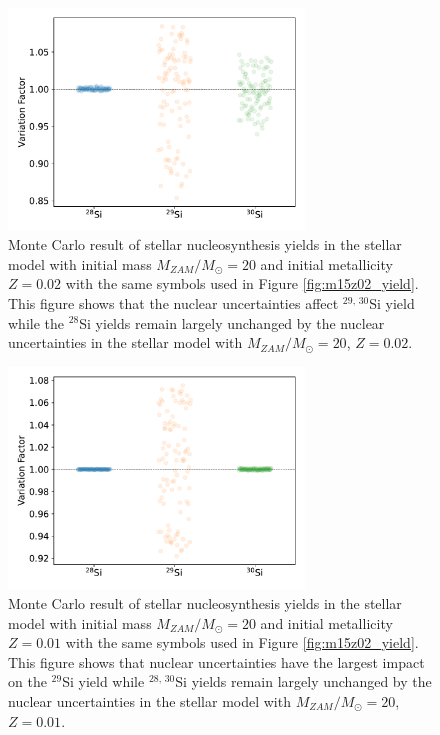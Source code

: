 \documentclass{brandeis-thesis3.2}
\def \msun {M_{\odot}}
\newcommand{\iso}[2]{$^{#1}${#2}}
\begin{document}
\begin{figure}[H]
    \centering
    \includegraphics[width=0.7\textwidth]{figs/M20Z2E-2_mcyieldresult.pdf}
    \caption{Monte Carlo result of stellar nucleosynthesis yields in the stellar model with initial mass $M_{ZAM}/\msun =20$ and initial metallicity $Z=0.02$ with the same symbols used in Figure \ref{fig:m15z02_yield}. This figure shows that the nuclear uncertainties affect \iso{29,\, 30}{Si} yield while the \iso{28}{Si} yields remain largely unchanged by the nuclear uncertainties in the stellar model with $M_{ZAM}/\msun =20$, $Z=0.02$.}
    \label{fig:m20z02_yield}
\end{figure}

\begin{figure}[H]
    \centering
    \includegraphics[width=0.7\textwidth]{figs/M20Z1E-2_mcyieldresult.pdf}
    \caption{Monte Carlo result of stellar nucleosynthesis yields in the stellar model with initial mass $M_{ZAM}/\msun =20$ and initial metallicity $Z=0.01$ with the same symbols used in Figure \ref{fig:m15z02_yield}. This figure shows that nuclear uncertainties have the largest impact on the \iso{29}{Si} yield while \iso{28,\, 30}{Si} yields remain largely unchanged by the nuclear uncertainties in the stellar model with $M_{ZAM}/\msun =20$, $Z=0.01$.}
    \label{fig:m20z01_yield}
\end{figure}
\end{document}
